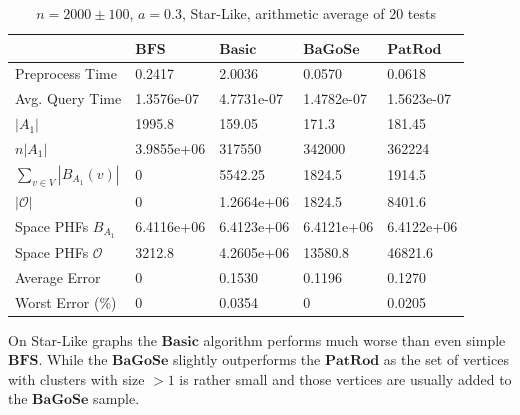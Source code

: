 \documentclass[shortabstract, lic, english]{iithesis}
\theoremstyle{definition} \newtheorem{definition}{Definition}[chapter]
\theoremstyle{plain} \newtheorem{remark}[definition]{Observation}
\theoremstyle{plain} \newtheorem{theorem}[definition]{Theorem}
\theoremstyle{plain} \newtheorem{lemma}[definition]{Lemma}
\theoremstyle{plain} \newtheorem{conjecture}[definition]{Conjecture}
\begin{document}
\begin{table}[H]
    \centering
    \begin{tabular}{ |p{3cm}||p{2cm}|p{2cm}|p{2cm}|p{2cm}|  } 
        \hline
        & $\mathbf{BFS}$ & $\mathbf{Basic}$ & $\mathbf{BaGoSe}$ & $\mathbf{PatRod}$ \\
        \hline
        \hline
        Preprocess Time                 & 0.2417     & 2.0036     & 0.0570      & 0.0618     \\
        \hline
        Avg. Query Time                 & 1.3576e-07 & 4.7731e-07 & 1.4782e-07  & 1.5623e-07 \\
        \hline
        $|A_1|$                         & 1995.8     & 159.05     & 171.3       & 181.45      \\
        \hline
        $n  |A_1|$                     & 3.9855e+06 & 317550     & 342000      & 362224     \\
        \hline
        $\sum_{v \in V} |B_{A_1}(v)| $  & 0          & 5542.25    & 1824.5      & 1914.5     \\
        \hline
        $|\mathcal{O}|$                 & 0          & 1.2664e+06 & 1824.5      & 8401.6     \\
        \hline
        Space PHFs $B_{A_1}$            & 6.4116e+06 & 6.4123e+06 & 6.4121e+06  & 6.4122e+06 \\
        \hline
        Space PHFs $\mathcal{O}$        & 3212.8     & 4.2605e+06 & 13580.8     & 46821.6     \\
        \hline
        Average Error                   & 0          & 0.1530     & 0.1196      & 0.1270     \\
        \hline
        Worst Error (\%)                & 0          & 0.0354     & 0           & 0.0205     \\
        \hline

    \end{tabular}
    \caption{$n = 2000 \pm 100$, $a = 0.3$, Star-Like, arithmetic average of $20$ tests}
\end{table}

On Star-Like graphs the $\mathbf{Basic}$ algorithm performs much worse than even simple $\mathbf{BFS}$.
While the $\mathbf{BaGoSe}$ slightly outperforms the $\mathbf{PatRod}$ as the set of vertices with clusters with size $>1$
is rather small and those vertices are usually added to the $\mathbf{BaGoSe}$ sample.
\end{document}

